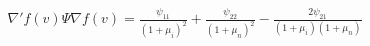 \documentclass[12pt,oneside,a4paper]{article}
\begin{document}
\begin{align*}
\nabla'f(v) \Psi \nabla f(v)=
	\frac{\psi_{11}}{(1+\mu_{i})^2} +
	\frac{\psi_{22}}{(1+\mu_{n})^2} -
	\frac{2\psi_{21}}{(1+\mu_{i})(1+\mu_{n})} 
\end{align*}

\clearpage
\renewcommand\bibname{REFERENCES} 


\end{document}
